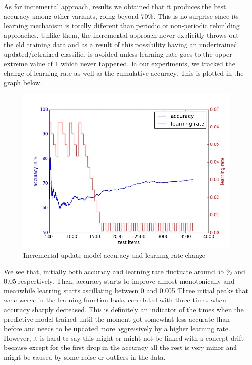 \documentclass{article} %
\begin{document}
As for incremental approach, results we obtained that it produces the best accuracy among other variants, going beyond 70\%. This is no surprise since its learning mechanism is totally different than periodic or non-periodic rebuilding approaches. Unlike them, the incremental approach never explicitly throws out the old training data and as a result of this possibility having an undertrained updated/retrained classifier is avoided unless learning rate goes to the upper extreme value of 1 which never happened. In our experiments, we tracked the change of learning rate as well as the cumulative accuracy. This is plotted in the graph below. 

\newpage
 \begin{figure}[htbp]
  \centering
  \includegraphics[scale=0.5]{./plots/incremental_plot.png}
  \caption{Incremental update model accuracy and learning rate change}
\end{figure}


We see that, initially both accuracy and learning rate fluctuate around 65 \% and 0.05 respectively. Then, accuracy starts to improve almost monotonically and meanwhile learning starts oscillating between 0 and 0.005   Three initial peaks that we observe in the learning function looks correlated with three times when accuracy sharply decreased. This is definitely an indicator of the times when the predictive model trained until the moment got somewhat less accurate than before and needs to be updated more aggressively by a higher learning rate. However, it is hard to say this might or might not be linked with a concept drift because except for the first drop in the accuracy all the rest is very minor and might be caused by some noise or outliers in the data.
\end{document}
